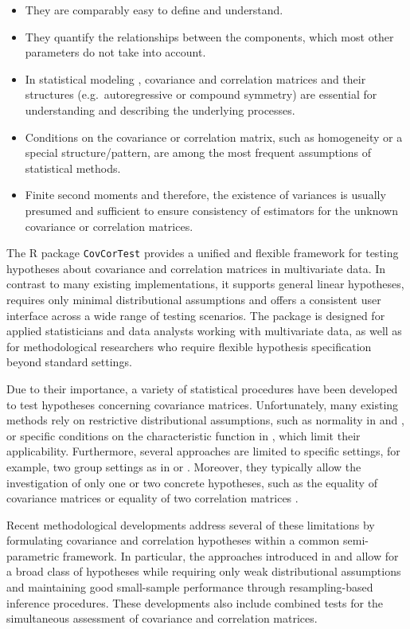 \begin{itemize}
\item
  They are comparably easy to define and understand.
\item
  They quantify the relationships between the components, which most other
  parameters do not take into account.
\item
  In statistical modeling , covariance and correlation matrices and their
  structures (e.g.~autoregressive or compound symmetry) are essential for
  understanding and describing the underlying processes.
\item
  Conditions on the covariance or correlation matrix, such as homogeneity or a
  special structure/pattern, are among the most frequent assumptions of
  statistical methods.
\item
  Finite second moments and therefore, the existence of variances is usually
  presumed and sufficient to ensure consistency of estimators for the unknown
  covariance or correlation matrices.
\end{itemize}

The R package \texttt{CovCorTest} provides a unified and flexible framework for
testing hypotheses about covariance and correlation matrices in multivariate
data. In contrast to many existing implementations, it supports general linear
hypotheses, requires only minimal distributional assumptions and offers a
consistent user interface across a wide range of testing scenarios. The package
is designed for applied statisticians and data analysts working with
multivariate data, as well as for methodological researchers who require
flexible hypothesis specification beyond standard settings.

Due to their importance, a variety of statistical procedures have been
developed to test hypotheses concerning covariance matrices. Unfortunately,
many existing methods rely on restrictive distributional assumptions, such as
normality in \citet{box1953} and \citet{zhong2017}, or specific conditions on
the characteristic function in \citet{gupta2006}, which limit their
applicability. Furthermore, several approaches are limited to specific
settings, for example, two group settings as in \citet{sakaori2002} or
\citet{omelka2012}. Moreover, they typically allow the investigation of only
one or two concrete hypotheses, such as the equality of covariance matrices
\citep[e.g.,][]{yang2012, zhu2002} or equality of two correlation
matrices \citep[e.g.,][]{jennrich1970}.

Recent methodological developments address several of these limitations by
formulating covariance and correlation hypotheses within a common
semi-parametric framework. In particular, the approaches introduced in
\citet{sattler2022} and \citet{sattler2023} allow for a broad class of
hypotheses while requiring only weak distributional assumptions and maintaining
good small-sample performance through resampling-based inference procedures.
These developments also include combined tests for the simultaneous assessment
of covariance and correlation matrices.

